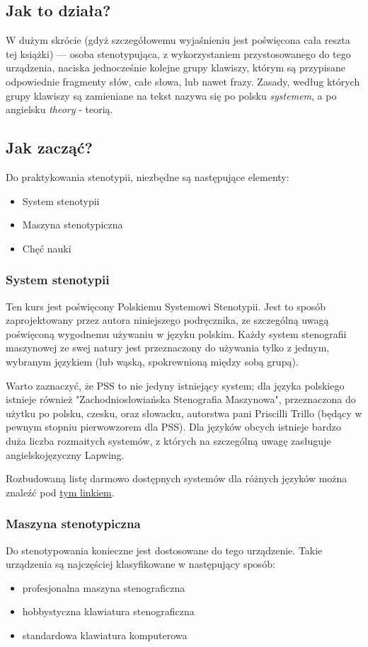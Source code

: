 \documentclass[12p, oneside]{book}
\begin{document}
\subsection*{Jak to działa?}
W dużym skrócie (gdyż szczegółowemu wyjaśnieniu jest poświęcona cała reszta tej książki) --- osoba stenotypująca, z wykorzystaniem przystosowanego do tego urządzenia, naciska jednocześnie kolejne grupy klawiszy, którym są przypisane odpowiednie fragmenty słów, całe słowa, lub nawet frazy. Zasady, według których grupy klawiszy są zamieniane na tekst nazywa się po polsku \emph{systemem}, a po angielsku \emph{theory} - teorią.

\subsection*{Jak zacząć?}
Do praktykowania stenotypii, niezbędne są następujące elementy:
\begin{itemize}
	\item System stenotypii
	\item Maszyna stenotypiczna
	\item Chęć nauki
\end{itemize}

\subsubsection{System stenotypii}
Ten kurs jest poświęcony Polskiemu Systemowi Stenotypii. Jest to sposób zaprojektowany przez autora niniejszego podręcznika, ze szczególną uwagą poświęconą wygodnemu używaniu w języku polskim. Każdy system stenografii maszynowej ze swej natury jest przeznaczony do używania tylko z jednym, wybranym językiem (lub wąską, spokrewnioną między sobą grupą).

Warto zaznaczyć, że PSS to nie jedyny istniejący system; dla języka polskiego istnieje również "Zachodniosłowiańska Stenografia Maszynowa", przeznaczona do użytku po polsku, czesku, oraz słowacku, autorstwa pani Priscilli Trillo (będący w pewnym stopniu pierwowzorem dla PSS). Dla języków obcych istnieje bardzo duża liczba rozmaitych systemów, z których na szczególną uwagę zasługuje angielskojęzyczny Lapwing.

Rozbudowaną listę darmowo dostępnych systemów dla różnych języków można znaleźć pod \href{https://plover.wiki/index.php/Steno_layouts_and_supported_languages}{tym linkiem}.

\subsubsection{Maszyna stenotypiczna}
Do stenotypowania konieczne jest dostosowane do tego urządzenie. Takie urządzenia są najczęściej klasyfikowane w następujący sposób:
\begin{itemize}
	\item profesjonalna maszyna stenograficzna
	\item hobbystyczna klawiatura stenograficzna
	\item standardowa klawiatura komputerowa
\end{itemize}
\end{document}
